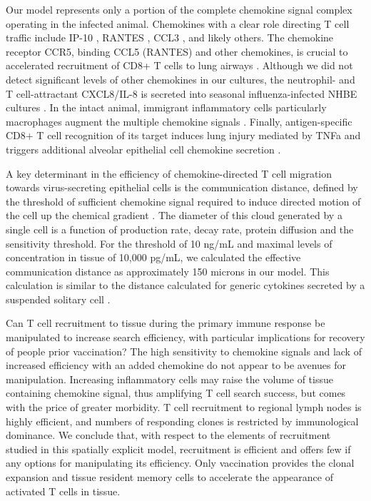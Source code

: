 \documentclass[10pt]{article}
\begin{document}
Our model represents only a portion of the complete chemokine signal complex operating in the infected animal.  Chemokines with a clear role directing T cell traffic include IP-10 \cite{Dufour2002}, RANTES \cite{Kawai1999}, CCL3 \cite{Kawai1999}, and likely others.  The chemokine receptor CCR5, binding CCL5 (RANTES) and other chemokines, is crucial to accelerated recruitment of CD8+ T cells to lung airways \cite{Kohlmeier2008}.  Although we did not detect significant levels of other chemokines in our cultures, the neutrophil- and T cell-attractant CXCL8/IL-8 is secreted into seasonal influenza-infected NHBE cultures \cite{Matsukura1996, Arndt2002}.  In the intact animal, immigrant inflammatory cells particularly macrophages augment the multiple chemokine signals \cite{Julkunen2000}.  Finally, antigen-specific CD8+ T cell recognition of its target induces lung injury mediated by TNFa and triggers additional alveolar epithelial cell chemokine secretion \cite{Zhao2000}.

A key determinant in the efficiency of chemokine-directed T cell migration towards virus-secreting epithelial cells is the communication distance, defined by the threshold of sufficient chemokine signal required to induce directed motion of the cell up the chemical gradient \cite{Thelen2008}.  The diameter of this cloud generated by a single cell is a function of production rate, decay rate, protein diffusion and the sensitivity threshold.  For the threshold of 10 ng/mL and maximal levels of concentration in tissue of 10,000 pg/mL, we calculated the effective communication distance as approximately 150 microns in our model.  This calculation is similar to the distance calculated for generic cytokines secreted by a suspended solitary cell \cite{Francis1997}.

Can T cell recruitment to tissue during the primary immune response be manipulated to increase search efficiency, with particular implications for recovery of people prior vaccination?  The high sensitivity to chemokine signals and lack of increased efficiency with an added chemokine do not appear to be avenues for manipulation. Increasing inflammatory cells may raise the volume of tissue containing chemokine signal, thus amplifying T cell search success, but comes with the price of greater morbidity. T cell recruitment to regional lymph nodes is highly efficient, and numbers of responding clones is restricted by immunological dominance. We conclude that, with respect to the elements of recruitment studied in this spatially explicit model, recruitment is efficient and offers few if any options for manipulating its efficiency. Only vaccination provides the clonal expansion and tissue resident memory cells to accelerate the appearance of activated T cells in tissue.
\end{document}

